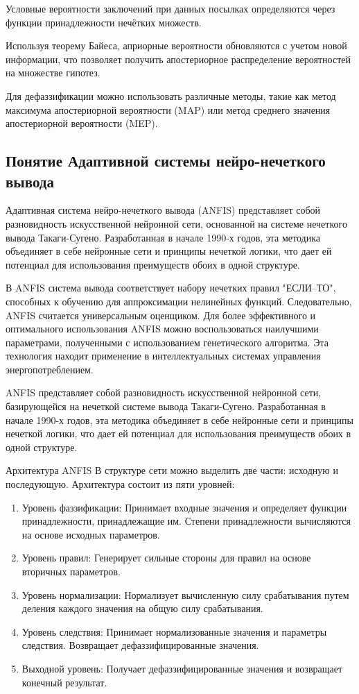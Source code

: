 Условные вероятности заключений при данных посылках определяются через функции принадлежности нечётких множеств.

Используя теорему Байеса, априорные вероятности обновляются с учетом новой информации, что позволяет получить апостериорное распределение вероятностей на множестве гипотез.

Для дефаззификации можно использовать различные методы, такие как метод максимума апостериорной вероятности (MAP) или метод среднего значения апостериорной вероятности (MEP).

\subsection{Понятие Адаптивной системы нейро-нечеткого вывода}
Адаптивная система нейро-нечеткого вывода (ANFIS) представляет собой разновидность искусственной нейронной сети, основанной на системе нечеткого вывода Такаги-Сугено. Разработанная в начале 1990-х годов, эта методика объединяет в себе нейронные сети и принципы нечеткой логики, что дает ей потенциал для использования преимуществ обоих в одной структуре.

В ANFIS система вывода соответствует набору нечетких правил "ЕСЛИ–ТО", способных к обучению для аппроксимации нелинейных функций. Следовательно, ANFIS считается универсальным оценщиком. Для более эффективного и оптимального использования ANFIS можно воспользоваться наилучшими параметрами, полученными с использованием генетического алгоритма. Эта технология находит применение в интеллектуальных системах управления энергопотреблением.

ANFIS представляет собой разновидность искусственной нейронной сети, базирующейся на нечеткой системе вывода Такаги-Сугено. Разработанная в начале 1990-х годов, эта методика объединяет в себе нейронные сети и принципы нечеткой логики, что дает ей потенциал для использования преимуществ обоих в одной структуре.

Архитектура ANFIS
В структуре сети можно выделить две части: исходную и последующую. Архитектура состоит из пяти уровней:
\begin{enumerate}
\item Уровень фаззификации: Принимает входные значения и определяет функции принадлежности, принадлежащие им. Степени принадлежности вычисляются на основе исходных параметров.
\item Уровень правил: Генерирует сильные стороны для правил на основе вторичных параметров.
\item Уровень нормализации: Нормализует вычисленную силу срабатывания путем деления каждого значения на общую силу срабатывания.
\item Уровень следствия: Принимает нормализованные значения и параметры следствия. Возвращает дефаззифицированные значения.
\item Выходной уровень: Получает дефаззифицированные значения и возвращает конечный результат.
\end{enumerate}

